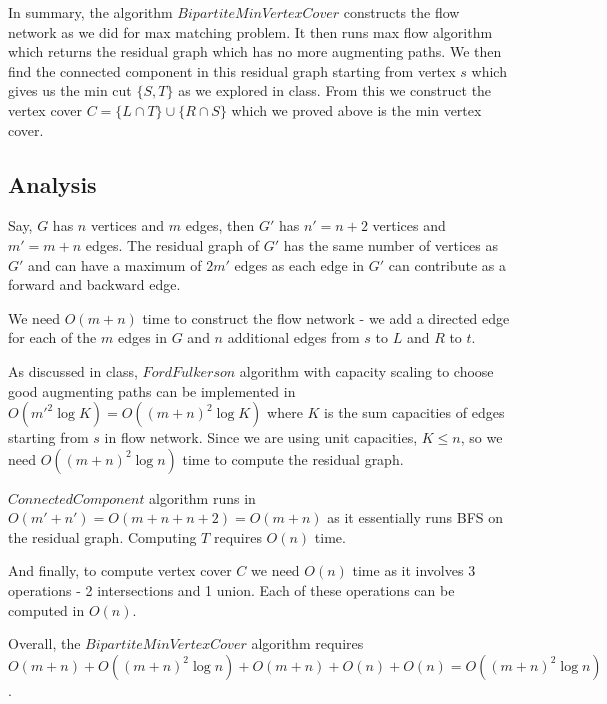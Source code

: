 \documentclass{article}
\begin{document}
    In summary, the algorithm $BipartiteMinVertexCover$ constructs the flow network as we did for max matching problem. It then runs max flow algorithm which returns the residual graph which has no more augmenting paths. We then find the connected component in this residual graph starting from vertex $s$ which gives us the min cut $\{S, T\}$ as we explored in class. From this we construct the vertex cover $C = \{L \cap T\} \cup \{R \cap S\}$ which we proved above is the min vertex cover.

    \subsection*{Analysis}
    Say, $G$ has $n$ vertices and $m$ edges, then $G'$ has $n' = n+2$ vertices and $m' = m+n$ edges. The residual graph of $G'$ has the same number of vertices as $G'$ and can have a maximum of $2m'$ edges as each edge in $G'$ can contribute as a forward and backward edge.

    We need $O(m+n)$ time to construct the flow network - we add a directed edge for each of the $m$ edges in $G$ and $n$ additional edges from $s$ to $L$ and $R$ to $t$.
    
    As discussed in class, $FordFulkerson$ algorithm with capacity scaling to choose good augmenting paths can be implemented in $O(m'^2 \log K) = O((m+n)^2 \log K)$ where $K$ is the sum capacities of edges starting from $s$ in flow network. Since we are using unit capacities, $K \le n$, so we need $O((m+n)^2 \log n)$ time to compute the residual graph.
    
    $ConnectedComponent$ algorithm runs in $O(m'+n') = O(m+n+n+2) = O(m+n)$ as it essentially runs BFS on the residual graph. Computing $T$ requires $O(n)$ time.

    And finally, to compute vertex cover $C$ we need $O(n)$ time as it involves 3 operations - 2 intersections and 1 union. Each of these operations can be computed in $O(n)$.

    Overall, the $BipartiteMinVertexCover$ algorithm requires $O(m+n) + O((m+n)^2 \log n) + O(m+n) + O(n) + O(n) = O((m+n)^2 \log n)$.
\end{document}
